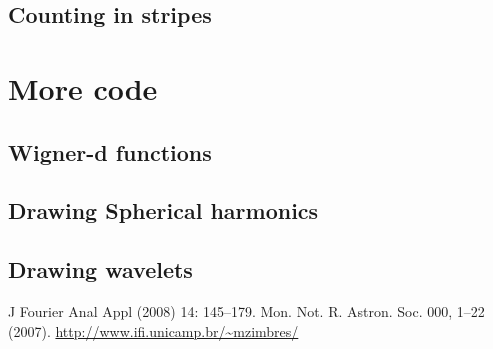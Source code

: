 \documentclass[12pt]{report}
\begin{document}
\section{Counting in stripes} \label{ch::raios-cosmicos}


\chapter{More code}
\section{Wigner-d functions}
\section{Drawing Spherical harmonics}
\section{Drawing wavelets}

\begin{thebibliography}{99}
 J Fourier Anal Appl (2008) 14: 145–179.
 Mon. Not. R. Astron. Soc. 000, 1–22 (2007). 
 \url{http://www.ifi.unicamp.br/~mzimbres/}
\end{thebibliography}
\end{document}
